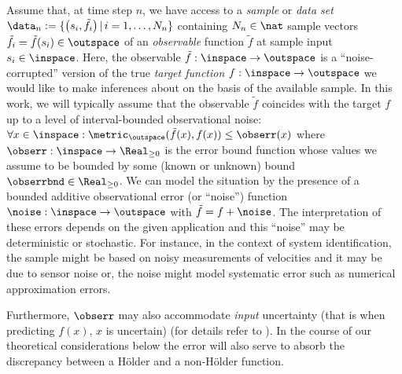 Assume that, at time step $n$, we have access to a \textit{sample} or \textit{data set} $\data_n:= \{\bigl( s_i, \tilde f_i \bigr) \, \vert \, i=1,\ldots, N_n \} $ containing $N_n \in \nat$ sample vectors $\tilde f_i = \tilde f(s_i) \in \outspace$ of an \emph{observable}   function $\tilde f$ at sample input $s_i \in \inspace$. Here, the observable $\tilde f : \inspace \to \outspace$ is a ``noise-corrupted'' version of the true \emph{target function} $f: \inspace \to \outspace$ we would like to make inferences about on the basis of the available sample. In this work, we will typically assume that the observable $\tilde f$ coincides with the target $f$ up to a level of interval-bounded observational noise: $\forall x \in \inspace: \metric_\outspace(\tilde f(x),f(x) ) \leq \obserr(x) $ where $\obserr : \inspace \to \Real_{\geq 0}$ is the error bound function whose values we assume to be bounded by some (known or unknown) bound $\obserrbnd \in \Real_{\geq 0}$. We can model the situation by the presence of a bounded additive observational error (or ``noise'') function $\noise:\inspace \to \outspace$ with $\tilde f = f + \noise$.
The interpretation of these errors depends on the given application and this ``noise'' may be deterministic or stochastic. For instance, in the context of system identification, the sample might be based on noisy measurements of velocities and it may be due to sensor noise or, the noise might model systematic error such as numerical approximation errors. 

Furthermore, $\obserr$ may also accommodate \textit{input} uncertainty (that is when predicting $f(x)$, $x$ is uncertain) (for details refer to \cite{calliess2014_thesis}). In the course of our theoretical considerations below the error will also serve to absorb the discrepancy between a H\"older and a non-H\"older function.
%

